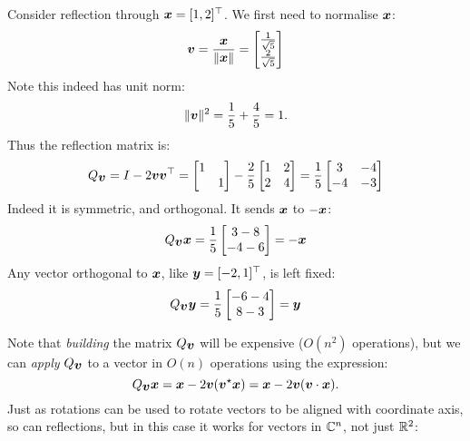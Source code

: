 \begin{example} Consider reflection through $\bm{{\mbox{\boldmath$x$\unboldmath}}} = [1,2]^\top$.  We first need to normalise $\bm{{\mbox{\boldmath$x$\unboldmath}}}$:
\[
\bm{{\mbox{\boldmath$v$\unboldmath}}} = {\bm{{\mbox{\boldmath$x$\unboldmath}}} \over \|\bm{{\mbox{\boldmath$x$\unboldmath}}}\|} = \begin{bmatrix} {1 \over \sqrt{5}} \\ {2 \over \sqrt{5}} \end{bmatrix}
\]
Note this indeed has unit norm:
\[
\|\bm{{\mbox{\boldmath$v$\unboldmath}}}\|^2 = {1 \over 5} + {4 \over 5} = 1.
\]
Thus the reflection matrix is:
\[
Q_{\mbox{\boldmath$v$\unboldmath}} = I - 2 \bm{{\mbox{\boldmath$v$\unboldmath}}} \bm{{\mbox{\boldmath$v$\unboldmath}}}^\top = \begin{bmatrix}1 \\ & 1 \end{bmatrix} - {2 \over 5} \begin{bmatrix} 1 & 2 \\ 2 & 4 \end{bmatrix}
 =  {1 \over 5} \begin{bmatrix} 3 & -4 \\ -4 & -3 \end{bmatrix}
\]
Indeed it is symmetric, and orthogonal. It sends $\bm{{\mbox{\boldmath$x$\unboldmath}}}$ to $-\bm{{\mbox{\boldmath$x$\unboldmath}}}$:
\[
Q_{\mbox{\boldmath$v$\unboldmath}} \bm{{\mbox{\boldmath$x$\unboldmath}}} = {1 \over 5} \begin{bmatrix}3 - 8 \\ -4 - 6 \end{bmatrix} = -\bm{{\mbox{\boldmath$x$\unboldmath}}}
\]
Any vector orthogonal to $\bm{{\mbox{\boldmath$x$\unboldmath}}}$, like $\bm{{\mbox{\boldmath$y$\unboldmath}}} = [-2,1]^\top$, is left fixed:
\[
Q_{\mbox{\boldmath$v$\unboldmath}} \bm{{\mbox{\boldmath$y$\unboldmath}}} = {1 \over 5} \begin{bmatrix}-6 -4 \\ 8 - 3 \end{bmatrix} = \bm{{\mbox{\boldmath$y$\unboldmath}}}
\]
\end{example}

Note that \emph{building} the matrix $Q_{\mbox{\boldmath$v$\unboldmath}}$ will be expensive ($O(n^2)$ operations), but we can \emph{apply} $Q_{\mbox{\boldmath$v$\unboldmath}}$ to a vector in $O(n)$ operations using the expression:
\[
Q_{\mbox{\boldmath$v$\unboldmath}} \bm{{\mbox{\boldmath$x$\unboldmath}}} = \bm{{\mbox{\boldmath$x$\unboldmath}}} - 2 \bm{{\mbox{\boldmath$v$\unboldmath}}} (\bm{{\mbox{\boldmath$v$\unboldmath}}}^\star \bm{{\mbox{\boldmath$x$\unboldmath}}}) = \bm{{\mbox{\boldmath$x$\unboldmath}}} - 2 \bm{{\mbox{\boldmath$v$\unboldmath}}} (\bm{{\mbox{\boldmath$v$\unboldmath}}} \cdot \bm{{\mbox{\boldmath$x$\unboldmath}}}).
\]
Just as rotations can be used to rotate vectors to be aligned with coordinate axis, so can reflections, but in this case it works for vectors in ${\mathbb C}^n$, not just ${\mathbb R}^2$:

